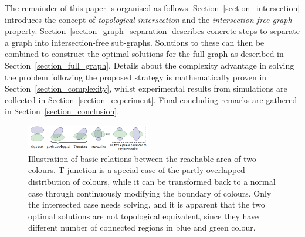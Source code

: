 \documentclass[conference]{IEEEtran}
\begin{document}
The remainder of this paper is organised as follows. Section~\ref{section_intersection} introduces the concept of \textit{topological intersection} and the \textit{intersection-free graph} property.
Section~\ref{section_graph_separation} describes concrete steps to separate a graph into intersection-free sub-graphs. 
Solutions to these can then be combined to construct the optimal solutions for the full graph as described in Section~\ref{section_full_graph}. Details  about the complexity advantage in solving the problem following the proposed strategy is mathematically proven in Section~\ref{section_complexity}, whilst experimental results from simulations are collected in Section~\ref{section_experiment}. Final concluding remarks are gathered in Section~\ref{section_conclusion}.

\begin{figure}[t]
\centering
\includegraphics[width = 0.48\textwidth]{figures/basic_shape_3}
\caption{Illustration of basic relations between the reachable area of two colours. T-junction is a special case of the partly-overlapped distribution of colours, while it can be transformed back to a normal case through continuously modifying the boundary of colours. Only the intersected case needs solving, and it is apparent that the two optimal solutions are not topological equivalent, since they have different number of connected regions in blue and green colour. }\label{fig:basic_shape}
\end{figure}
\end{document}
